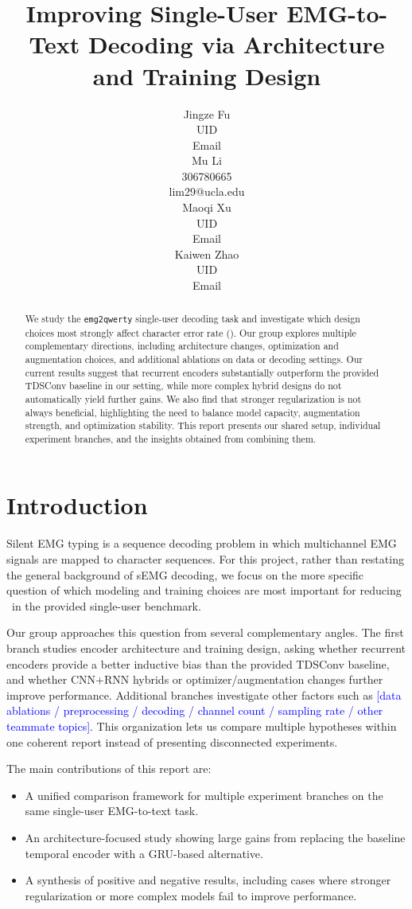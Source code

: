 \documentclass{article}
\title{Improving Single-User EMG-to-Text Decoding via Architecture and Training Design}
\author{
  Jingze Fu \\
  UID \\ Email \\
  \And
  Mu Li \\
  306780665 \\ lim29@ucla.edu \\
  \And
  Maoqi Xu \\
  UID \\ Email \\
  \And
  Kaiwen Zhao \\
  UID \\ Email
}
\newcommand{\cer}{\mathrm{CER}}
\newcommand{\todo}[1]{\textcolor{blue}{[#1]}}
\begin{document}
\maketitle

\begin{abstract}
We study the \texttt{emg2qwerty} single-user decoding task and investigate which design choices most strongly affect character error rate (\cer). 
Our group explores multiple complementary directions, including architecture changes, optimization and augmentation choices, and additional ablations on data or decoding settings.
Our current results suggest that recurrent encoders substantially outperform the provided TDSConv baseline in our setting, while more complex hybrid designs do not automatically yield further gains.
We also find that stronger regularization is not always beneficial, highlighting the need to balance model capacity, augmentation strength, and optimization stability.
This report presents our shared setup, individual experiment branches, and the insights obtained from combining them.

\end{abstract}

\section{Introduction}

Silent EMG typing is a sequence decoding problem in which multichannel EMG signals are mapped to character sequences.
For this project, rather than restating the general background of sEMG decoding, we focus on the more specific question of which modeling and training choices are most important for reducing \cer\ in the provided single-user benchmark.

Our group approaches this question from several complementary angles.
The first branch studies encoder architecture and training design, asking whether recurrent encoders provide a better inductive bias than the provided TDSConv baseline, and whether CNN+RNN hybrids or optimizer/augmentation changes further improve performance.
Additional branches investigate other factors such as \todo{data ablations / preprocessing / decoding / channel count / sampling rate / other teammate topics}.
This organization lets us compare multiple hypotheses within one coherent report instead of presenting disconnected experiments.

The main contributions of this report are:
\begin{itemize}[leftmargin=1.2em]
    \item A unified comparison framework for multiple experiment branches on the same single-user EMG-to-text task.
    \item An architecture-focused study showing large gains from replacing the baseline temporal encoder with a GRU-based alternative.
    \item A synthesis of positive and negative results, including cases where stronger regularization or more complex models fail to improve performance.
\end{itemize}
\end{document}
